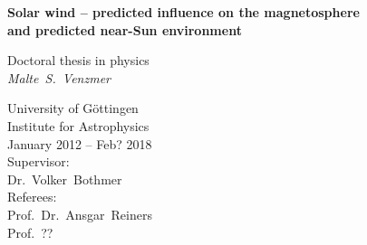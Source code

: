 
\begin{titlepage}
	\begin{center}
	
	
		\vspace*{10mm}
		\Large

		\textbf{Solar wind -- predicted influence on the magnetosphere\\and predicted near-Sun environment} 
		
		\vspace{15mm}
		\large
		Doctoral thesis in physics\\
		\vspace{15mm}
		\textit{Malte~S.~Venzmer}\\
		\vspace{10mm}
		
		
		\vspace{10mm}

		University of Göttingen\\
		\vspace{5mm}
		Institute for Astrophysics\\
		\vspace{5mm}
		January 2012 -- Feb? 2018\\
		\vspace{15mm}
		Supervisor:\\
		Dr.~Volker~Bothmer\\
		\vspace{5mm}
		Referees:\\
		Prof.~Dr.~Ansgar~Reiners\\
		Prof.~??\\
		
		
	\end{center}
\end{titlepage}

